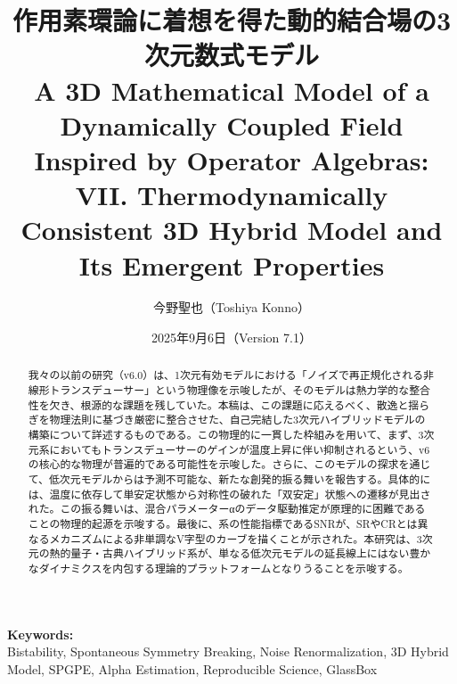 \documentclass[a4paper,11pt,ja=standard,lualatex]{bxjsarticle}
\begin{document}
\title{作用素環論に着想を得た動的結合場の3次元数式モデル\\
\large A 3D Mathematical Model of a Dynamically Coupled Field Inspired by Operator Algebras: VII. Thermodynamically Consistent 3D Hybrid Model and Its Emergent Properties}
\author[1]{今野聖也（Toshiya Konno）}
\date{2025年9月6日（Version 7.1）}
\maketitle

\noindent\textbf{Keywords:}\\
Bistability, Spontaneous Symmetry Breaking, Noise Renormalization, 3D Hybrid Model, SPGPE, Alpha Estimation, Reproducible Science, GlassBox

\begin{abstract}
\noindent
我々の以前の研究（v6.0）は、1次元有効モデルにおける「ノイズで再正規化される非線形トランスデューサー」という物理像を示唆したが、そのモデルは熱力学的な整合性を欠き、根源的な課題を残していた。本稿は、この課題に応えるべく、散逸と揺らぎを物理法則に基づき厳密に整合させた、自己完結した3次元ハイブリッドモデルの構築について詳述するものである。この物理的に一貫した枠組みを用いて、まず、3次元系においてもトランスデューサーのゲインが温度上昇に伴い抑制されるという、v6の核心的な物理が普遍的である可能性を示唆した。さらに、このモデルの探求を通じて、低次元モデルからは予測不可能な、新たな\mbox{創発}的振る舞いを報告する。具体的には、温度に依存して単安定状態から対称性の破れた「\mbox{双安定}」状態への遷移が見出された。この振る舞いは、混合パラメーターαのデータ駆動推定が原理的に困難であることの物理的起源を示唆する。最後に、系の性能指標であるSNRが、SRやCRとは異なるメカニズムによる非単調なV字型のカーブを描くことが示された。本研究は、3次元の熱的量子・古典ハイブリッド系が、単なる低次元モデルの延長線上にはない豊かなダイナミクスを内包する理論的プラットフォームとなりうることを示唆する。
\end{abstract}

\vspace{1em}
\end{document}
